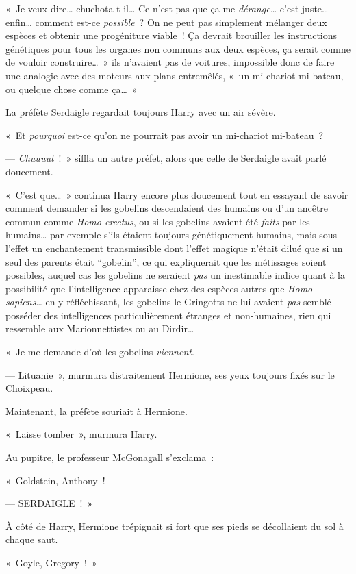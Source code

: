 «~Je veux dire… chuchota-t-il… Ce n'est pas que ça me \emph{dérange…} c'est juste… enfin… comment est-ce \emph{possible}~? On ne peut pas simplement mélanger deux espèces et obtenir une progéniture viable~! Ça devrait brouiller les instructions génétiques pour tous les organes non communs aux deux espèces, ça serait comme de vouloir construire…~» ils n'avaient pas de voitures, impossible donc de faire une analogie avec des moteurs aux plans entremêlés, «~un mi-chariot mi-bateau, ou quelque chose comme ça…~»

La préfète Serdaigle regardait toujours Harry avec un air sévère.

«~Et \emph{pourquoi} est-ce qu'on ne pourrait pas avoir un mi-chariot mi-bateau~?

--- \emph{Chuuuut}~!~» siffla un autre préfet, alors que celle de Serdaigle avait parlé doucement.

«~C'est que…~» continua Harry encore plus doucement tout en essayant de savoir comment demander si les gobelins descendaient des humains ou d'un ancêtre commun comme \emph{Homo erectus}, ou si les gobelins avaient été \emph{faits} par les humains… par exemple s'ils étaient toujours génétiquement humains, mais sous l'effet un enchantement transmissible dont l'effet magique n'était dilué que si un seul des parents était “gobelin”, ce qui expliquerait que les métissages soient possibles, auquel cas les gobelins ne seraient \emph{pas} un inestimable indice quant à la possibilité que l'intelligence apparaisse chez des espèces autres que \emph{Homo sapiens}… en y réfléchissant, les gobelins le Gringotts ne lui avaient \emph{pas} semblé posséder des intelligences particulièrement étranges et non-humaines, rien qui ressemble aux Marionnettistes ou au Dirdir…

«~Je me demande d'où les gobelins \emph{viennent}.

--- Lituanie~», murmura distraitement Hermione, ses yeux toujours fixés sur le Choixpeau.

Maintenant, la préfète souriait à Hermione.

«~Laisse tomber~», murmura Harry.

Au pupitre, le professeur McGonagall s'exclama~:

«~Goldstein, Anthony~!

--- SERDAIGLE~!~»

À côté de Harry, Hermione trépignait si fort que ses pieds se décollaient du sol à chaque saut.

«~Goyle, Gregory~!~»

